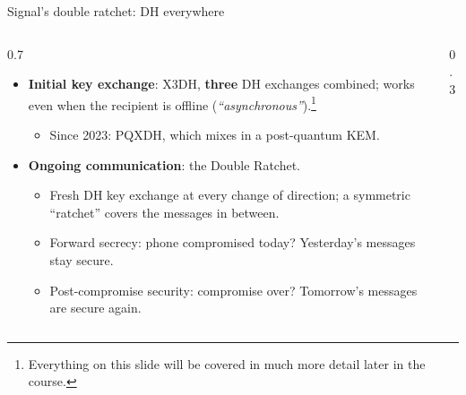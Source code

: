 \ifdefined\PRESENTATION\else\PassOptionsToClass{handout}{beamer}\fi\documentclass[aspectratio=169, lualatex]{beamer}
\begin{document}
\begin{frame}{Signal's double ratchet: DH everywhere}
	\begin{columns}[c]
		\begin{column}{0.7\textwidth}
			\begin{itemize}
				\item \textbf{Initial key exchange}: X3DH, \textbf{three} DH exchanges combined; works even when the recipient is offline (\textit{``asynchronous''}).\footnote{Everything on this slide will be covered in much more detail later in the course.}
				      \begin{itemize}
					      \item Since 2023: PQXDH, which mixes in a post-quantum KEM.
				      \end{itemize}
				\item \textbf{Ongoing communication}: the Double Ratchet.
				      \begin{itemize}
					      \item Fresh DH key exchange at every change of direction; a symmetric ``ratchet'' covers the messages in between.
					      \item Forward secrecy: phone compromised today? Yesterday's messages stay secure.
					      \item Post-compromise security: compromise over? Tomorrow's messages are secure again.
				      \end{itemize}
			\end{itemize}
		\end{column}
		\begin{column}{0.3\textwidth}
		\end{column}
	\end{columns}
\end{frame}
\end{document}

